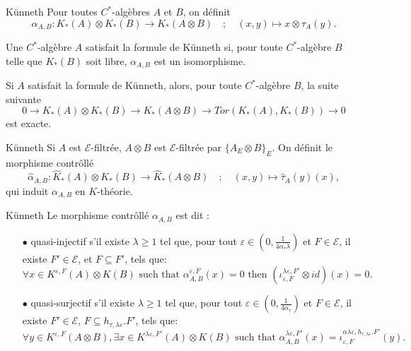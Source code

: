 \begin{frame}{Künneth}
Pour toutes $C^*$-algèbres $A$ et $B$, on définit
\[\alpha_{A,B} : K_*(A)\otimes K_*(B)\rightarrow K_*(A\otimes B) \quad ; \quad (x,y)\mapsto x\otimes   \tau_A(y).\]

\begin{definitionfr}
Une $C^*$-algèbre $A$ satisfait la formule de Künneth si, pour toute $C^*$-algèbre $B$ telle que $K_*(B)$ soit libre, $\alpha_{A,B}$ est un isomorphisme.
\end{definitionfr}

Si $A$ satisfait la formule de Künneth, alors, pour toute $C^*$-algèbre $B$, la suite suivante
\[0  \rightarrow K_*(A)\otimes K_*(B) \rightarrow K_*(A\otimes B)  \rightarrow Tor(K_*(A),K_*(B)) \rightarrow 0\]
est exacte.

\end{frame}

\begin{frame}{Künneth}
Si $A$ est $\mathcal E$-filtrée, $A\otimes B$ est $\mathcal E$-filtrée par $\{A_E\otimes B\}_E$. On définit le morphisme contrôllé  
\[\hat\alpha_{A,B} : \hat K_*(A)\otimes K_*(B)\rightarrow \hat K_*(A\otimes B) \quad ; \quad (x,y)\mapsto \hat\tau_A(y)(x),\]
qui induit $\alpha_{A,B}$ en $K$-théorie.\\
\end{frame}

\begin{frame}{Künneth}
Le morphisme contrôllé $\alpha_{A,B}$ est dit :
\begin{itemize}
 
\item[$\bullet$] quasi-injectif s'il existe $\lambda \geq 1$ tel que, pour tout $\varepsilon\in (0,\frac{1}{4\alpha_\tau \lambda})$ et $F\in\mathcal E$, il existe $F'\in\mathcal E$, et $F\subseteq F'$, tels que: 
\[\forall x\in K^{\varepsilon,F}(A)\otimes K(B)\text{ such that }\alpha_{A,B}^{\varepsilon,F}(x)=0 \text{ then }(\iota_{\varepsilon,F}^{\lambda\varepsilon,F'}\otimes id) (x) = 0.\] 

\item[$\bullet$] quasi-surjectif s'il existe $\lambda \geq 1$ tel que, pour tout $\varepsilon \in (0,\frac{1}{4\alpha_\tau})$ et $F\in\mathcal E$, il existe $F'\in\mathcal E$, $F\subseteq h_{\tau,\lambda\varepsilon}.F'$, tels que:
\[ \forall y\in K^{\varepsilon,F}(A\otimes B), \exists x\in K^{\lambda\varepsilon, F'}(A)\otimes K(B) \text{ such that }
\alpha^{\lambda\varepsilon,F'}_{A,B}(x)=\iota_{\varepsilon,F}^{\alpha\lambda\varepsilon,h_{\tau, \lambda\varepsilon}.F'}(y).\] 

\end{itemize}
\end{frame}

